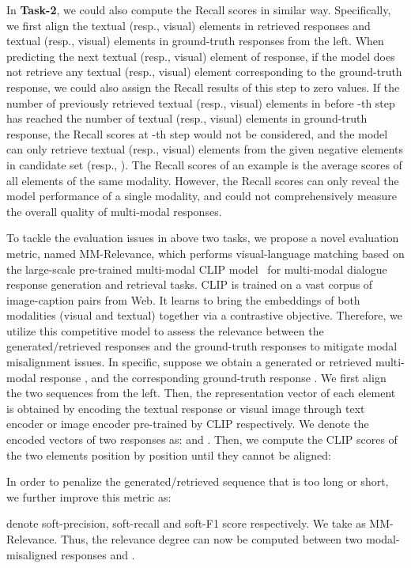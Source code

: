 \documentclass[11pt]{article}
\begin{document}
In \textbf{Task-2}, we could also compute the Recall scores in similar way. Specifically, we first align the textual (resp., visual) elements in retrieved responses and textual (resp., visual) elements in ground-truth responses from the left. When predicting the next textual (resp., visual) element of response, if the model does not retrieve any textual (resp., visual) element corresponding to the ground-truth response, we could also assign the Recall results of this step to zero values. If the number of previously retrieved textual (resp., visual) elements in  before -th step has reached the number of textual (resp., visual) elements in ground-truth response, the Recall scores at -th step would not be considered, and the model can only retrieve textual (resp., visual) elements from the given negative elements in candidate set  (resp., ). The Recall scores of an example is the average scores of all elements of the same modality. However, the Recall scores can only reveal the model performance of a single modality, and could not comprehensively measure the overall quality of multi-modal responses.




To tackle the evaluation issues in above two tasks, we propose a novel evaluation metric, named MM-Relevance, which performs visual-language matching based on the large-scale pre-trained multi-modal CLIP model~\cite{radford2021learning} for multi-modal dialogue response generation and retrieval tasks. CLIP is trained on a vast corpus of image-caption pairs from Web. It learns to bring the embeddings of both modalities (visual and textual) together via a contrastive objective. Therefore, we utilize this competitive model to assess the relevance between the generated/retrieved responses and the ground-truth responses to mitigate modal misalignment issues. In specific, suppose we obtain a generated or retrieved multi-modal response , and the corresponding ground-truth response . We first align the two sequences from the left. Then, the representation vector of each element is obtained by encoding the textual response or visual image through text encoder or image encoder pre-trained by CLIP respectively. We denote the encoded vectors of two responses as:  and . Then, we compute the CLIP scores of the two elements position by position until they cannot be aligned:

In order to penalize the generated/retrieved sequence that is too long or short, we further improve this metric as:

 denote soft-precision, soft-recall and soft-F1 score respectively. We take  as MM-Relevance. Thus, the relevance degree can now be computed between two modal-misaligned responses  and . 
\end{document}
